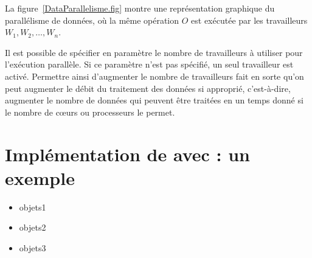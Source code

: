 La figure~\ref{DataParallelisme.fig} montre une repr\'esentation graphique du parall\'elisme de donn\'ees, o\`u la m\^eme op\'eration $O$ est ex\'ecut\'ee par les travailleurs $W_1, W_2,\ldots, W_n$. 

Il est possible de sp\'ecifier en param\`etre le nombre de travailleurs \`a utiliser pour l'ex\'ecution parall\`ele. Si ce param\`etre n'est pas sp\'ecifi\'e, un seul travailleur est activ\'e. Permettre ainsi d'augmenter le nombre de travailleurs fait en sorte qu'on peut augmenter le d\'ebit du traitement des donn\'ees si appropri\'e, c'est-\`a-dire, augmenter le nombre de donn\'ees qui peuvent \^etre trait\'ees en un temps donn\'e si le nombre de c\oe{}urs ou processeurs le permet.




\section{Impl\'ementation de  avec  : un exemple}


\begin{itemize}

\item objets1 

\item objets2 

\item objets3 


\end{itemize}
